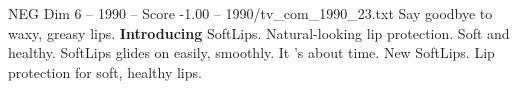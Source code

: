 \begin{textsample}{NEG Dim 6 – 1990 – Score -1.00 – 1990/tv\_com\_1990\_23.txt}  \label{ex:f6_neg_028}
Say goodbye to waxy, greasy lips. \textbf{Introducing} SoftLips.
Natural-looking lip protection.
Soft and healthy.
SoftLips glides on easily, smoothly.
It 's about time.
New SoftLips.
Lip protection for soft, healthy lips.

\end{textsample}
